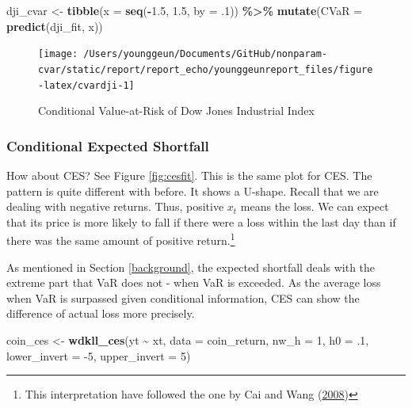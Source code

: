 \documentclass[
]{article}
\newenvironment{Shaded}{\begin{snugshade}}{\end{snugshade}}
\newcommand{\DataTypeTok}[1]{\textcolor[rgb]{0.13,0.29,0.53}{#1}}
\newcommand{\DecValTok}[1]{\textcolor[rgb]{0.00,0.00,0.81}{#1}}
\newcommand{\FloatTok}[1]{\textcolor[rgb]{0.00,0.00,0.81}{#1}}
\newcommand{\KeywordTok}[1]{\textcolor[rgb]{0.13,0.29,0.53}{\textbf{#1}}}
\newcommand{\NormalTok}[1]{#1}
\newcommand{\OperatorTok}[1]{\textcolor[rgb]{0.81,0.36,0.00}{\textbf{#1}}}
\newcommand{\StringTok}[1]{\textcolor[rgb]{0.31,0.60,0.02}{#1}}
\theoremstyle{definition}
\theoremstyle{definition}
\theoremstyle{definition}
\theoremstyle{remark}
\begin{document}
\begin{Shaded}
\begin{Highlighting}[]
\NormalTok{dji\_cvar <{-}}\StringTok{ }
\StringTok{  }\KeywordTok{tibble}\NormalTok{(}\DataTypeTok{x =} \KeywordTok{seq}\NormalTok{(}\OperatorTok{{-}}\FloatTok{1.5}\NormalTok{, }\FloatTok{1.5}\NormalTok{, }\DataTypeTok{by =} \FloatTok{.1}\NormalTok{)) }\OperatorTok{\%>\%}\StringTok{ }
\StringTok{  }\KeywordTok{mutate}\NormalTok{(}\DataTypeTok{CVaR =} \KeywordTok{predict}\NormalTok{(dji\_fit, x))}
\end{Highlighting}
\end{Shaded}

\begin{figure}[H]

{\centering \texttt{[image: /Users/younggeun/Documents/GitHub/nonparam-cvar/static/report/report\_echo/younggeunreport\_files/figure-latex/cvardji-1]} 

}

\caption{Conditional Value-at-Risk of Dow Jones Industrial Index}\label{fig:cvardji}
\end{figure}

\hypertarget{conditional-expected-shortfall}{%
\subsubsection{Conditional Expected Shortfall}\label{conditional-expected-shortfall}}

How about CES? See Figure \ref{fig:cesfit}. This is the same plot for CES. The pattern is quite different with before. It shows a U-shape. Recall that we are dealing with negative returns. Thus, positive \(x_t\) means the loss. We can expect that its price is more likely to fall if there were a loss within the last day than if there was the same amount of positive return.\footnote{This interpretation have followed the one by Cai and Wang (\protect\hyperlink{ref-cai:2008aa}{2008})}

As mentioned in Section \ref{background}, the expected shortfall deals with the extreme part that VaR does not - when VaR is exceeded. As the average loss when VaR is surpassed given conditional information, CES can show the difference of actual loss more precisely.

\begin{Shaded}
\begin{Highlighting}[]
\NormalTok{coin\_ces <{-}}\StringTok{ }\KeywordTok{wdkll\_ces}\NormalTok{(yt }\OperatorTok{\textasciitilde{}}\StringTok{ }\NormalTok{xt, }\DataTypeTok{data =}\NormalTok{ coin\_return, }\DataTypeTok{nw\_h =} \DecValTok{1}\NormalTok{, }\DataTypeTok{h0 =} \FloatTok{.1}\NormalTok{, }\DataTypeTok{lower\_invert =} \DecValTok{{-}5}\NormalTok{, }\DataTypeTok{upper\_invert =} \DecValTok{5}\NormalTok{)}
\end{Highlighting}
\end{Shaded}
\end{document}
